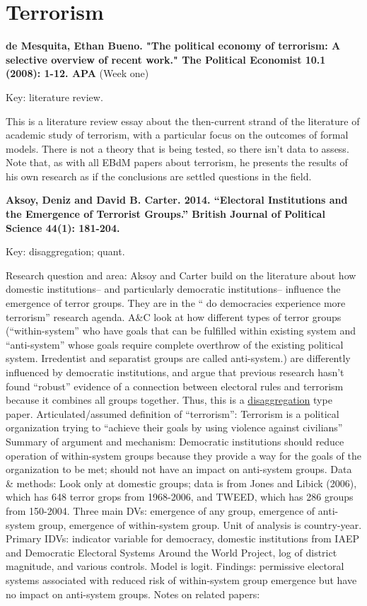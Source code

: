 \documentclass{article}[12pt]
\begin{document}
\section{Terrorism}

\textbf{de Mesquita, Ethan Bueno. "The political economy of terrorism: A selective overview of recent work." The Political Economist 10.1 (2008): 1-12.
APA} (Week one)

Key: literature review.
 
This is a literature review essay about the then-current strand of the literature of academic study of terrorism, with a particular focus on the outcomes of formal models.  There is not a theory that is being tested, so there isn't data to assess. Note that, as with all EBdM papers about terrorism, he presents the results of his own research as if the conclusions are settled questions in the field.

\textbf{Aksoy, Deniz and David B. Carter. 2014. “Electoral Institutions and the Emergence of Terrorist Groups.” British Journal of Political Science 44(1): 181-204.}

Key: disaggregation; quant.

Research question and area: Aksoy and Carter build on the literature about how domestic institutions-- and particularly democratic institutions-- influence the emergence of terror groups. They are in the `` do democracies experience more terrorism'' research agenda. A\&C look at how different types of terror groups (``within-system'' who have goals that can be fulfilled within existing system and ``anti-system'' whose goals require complete overthrow of the existing political system. Irredentist and separatist groups are called anti-system.) are differently influenced by democratic institutions, and argue that previous research hasn't found ``robust'' evidence of a connection between electoral rules and terrorism because it combines all groups together. Thus, this is a \underline{disaggregation} type paper.
Articulated/assumed definition of ``terrorism'': Terrorism is a political organization trying to ``achieve their goals by using violence against civilians''
Summary of argument and mechanism: Democratic institutions should reduce operation of within-system groups because they provide a way for the goals of the organization to be met; should not have an impact on anti-system groups.
Data \& methods: Look only at domestic groups; data is from Jones and Libick (2006), which has 648 terror grops from 1968-2006, and TWEED, which has 286 groups from 150-2004. Three main DVs: emergence of any group, emergence of anti-system group, emergence of within-system group. Unit of analysis is country-year. Primary IDVs: indicator variable for democracy, domestic institutions from IAEP and Democratic Electoral Systems Around the World Project, log of district magnitude, and various controls. Model is logit.
Findings: permissive electoral systems associated with reduced risk of within-system group emergence but have no impact on anti-system groups. 
Notes on related papers:
\end{document}
